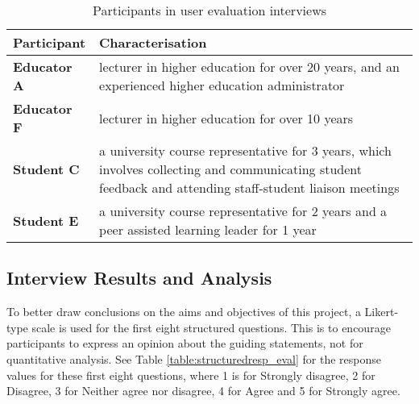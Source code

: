 \begin{table}[!h]
	\caption{Participants in user evaluation interviews}
	\centering
	\label{table:participants-eval}
	\begin{tabularx}{\textwidth}{>{\bfseries}lX}
		Participant & Characterisation                                                                    \\
		\toprule
		Educator A  & lecturer in higher education for over 20 years, and an experienced higher education
		administrator                                                                                     \\\midrule
		Educator F  & lecturer in higher education for over 10 years                                      \\\midrule
		Student C   & a university course representative for 3 years, which involves collecting and
		communicating student feedback and attending staff-student liaison meetings                       \\\midrule
		Student E   & a university course representative for 2 years and a peer assisted learning leader
		for 1 year                                                                                        \\\bottomrule
	\end{tabularx}
\end{table}

\subsection{Interview Results and Analysis}

To better draw conclusions on the aims and objectives of this project, a Likert-type scale is used
for the first eight structured questions. This is to encourage participants to express an opinion about the guiding statements,
not for quantitative analysis. See Table \ref{table:structuredresp_eval} for the response values for these first eight questions, 
where 1 is for Strongly disagree, 2 for Disagree, 3 for Neither agree nor disagree, 4 for Agree and 5 for Strongly agree.

